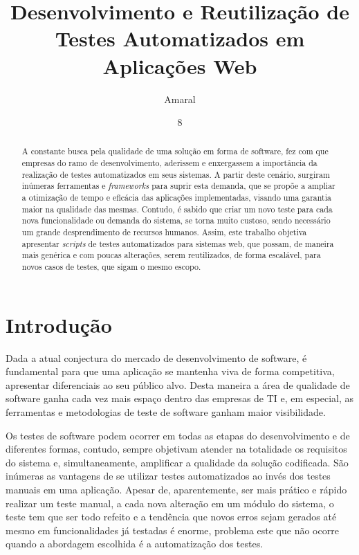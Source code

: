 \documentclass[tg]{mdtufsm}
\title{Desenvolvimento e Reutilização de Testes Automatizados em Aplicações Web}
\author{Amaral}{Lucas Antunes}
\institute{Centro de Tecnologia}
\date{8}{Outubro}{2014}
\begin{document}
\maketitle
\makeapprove

\begin{abstract}
A constante busca pela qualidade de uma solução em forma de software, fez com que empresas do ramo de desenvolvimento,
aderissem e enxergassem a importância da realização de testes automatizados em seus sistemas. A partir deste cenário,
surgiram inúmeras ferramentas e \emph{frameworks} para suprir esta demanda, que se propõe  a ampliar a otimização de tempo e
eficácia das aplicações implementadas, visando uma garantia maior na qualidade das mesmas. Contudo, é sabido que criar
um novo teste para cada nova funcionalidade ou demanda do sistema, se torna muito custoso, sendo necessário um grande
desprendimento de recursos humanos. Assim, este trabalho objetiva apresentar \emph{scripts} de testes automatizados para
sistemas web, que possam, de maneira mais genérica e com poucas alterações, serem reutilizados, de forma escalável,
para novos casos de testes, que sigam o mesmo escopo.
\end{abstract}

\tableofcontents

\setlength{\baselineskip}{1.5\baselineskip}

\chapter{Introdução}

Dada a atual conjectura do mercado de desenvolvimento de software, é fundamental para
que uma aplicação se mantenha viva de forma competitiva, apresentar diferenciais ao seu público alvo. Desta
maneira a área de qualidade de software ganha cada vez mais espaço dentro das empresas de TI e, em especial, as ferramentas e
metodologias de teste de software ganham maior visibilidade.

Os testes de software podem ocorrer em todas as etapas do desenvolvimento e de diferentes formas, contudo,
sempre objetivam atender na totalidade os requisitos do sistema e, simultaneamente, amplificar a qualidade da solução
codificada. São inúmeras as vantagens de se utilizar testes automatizados ao invés dos testes manuais em uma aplicação.
Apesar de, aparentemente, ser mais prático e rápido realizar um teste manual, a cada nova alteração em um módulo do sistema,
o teste tem que ser todo refeito e a tendência que novos erros sejam gerados até mesmo em funcionalidades já testadas é enorme,
problema este que não ocorre quando a abordagem escolhida é a automatização dos testes.
\end{document}
